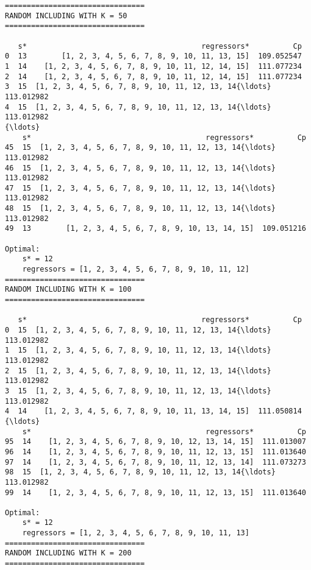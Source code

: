 \documentclass[11pt]{article}
\begin{document}
    \begin{Verbatim}[commandchars=\\\{\}]
================================
RANDOM INCLUDING WITH K = 50
================================

   s*                                        regressors*          Cp
0  13        [1, 2, 3, 4, 5, 6, 7, 8, 9, 10, 11, 13, 15]  109.052547
1  14    [1, 2, 3, 4, 5, 6, 7, 8, 9, 10, 11, 12, 14, 15]  111.077234
2  14    [1, 2, 3, 4, 5, 6, 7, 8, 9, 10, 11, 12, 14, 15]  111.077234
3  15  [1, 2, 3, 4, 5, 6, 7, 8, 9, 10, 11, 12, 13, 14{\ldots}  113.012982
4  15  [1, 2, 3, 4, 5, 6, 7, 8, 9, 10, 11, 12, 13, 14{\ldots}  113.012982
{\ldots}
    s*                                        regressors*          Cp
45  15  [1, 2, 3, 4, 5, 6, 7, 8, 9, 10, 11, 12, 13, 14{\ldots}  113.012982
46  15  [1, 2, 3, 4, 5, 6, 7, 8, 9, 10, 11, 12, 13, 14{\ldots}  113.012982
47  15  [1, 2, 3, 4, 5, 6, 7, 8, 9, 10, 11, 12, 13, 14{\ldots}  113.012982
48  15  [1, 2, 3, 4, 5, 6, 7, 8, 9, 10, 11, 12, 13, 14{\ldots}  113.012982
49  13        [1, 2, 3, 4, 5, 6, 7, 8, 9, 10, 13, 14, 15]  109.051216

Optimal:
	s* = 12
	regressors = [1, 2, 3, 4, 5, 6, 7, 8, 9, 10, 11, 12]
================================
RANDOM INCLUDING WITH K = 100
================================

   s*                                        regressors*          Cp
0  15  [1, 2, 3, 4, 5, 6, 7, 8, 9, 10, 11, 12, 13, 14{\ldots}  113.012982
1  15  [1, 2, 3, 4, 5, 6, 7, 8, 9, 10, 11, 12, 13, 14{\ldots}  113.012982
2  15  [1, 2, 3, 4, 5, 6, 7, 8, 9, 10, 11, 12, 13, 14{\ldots}  113.012982
3  15  [1, 2, 3, 4, 5, 6, 7, 8, 9, 10, 11, 12, 13, 14{\ldots}  113.012982
4  14    [1, 2, 3, 4, 5, 6, 7, 8, 9, 10, 11, 13, 14, 15]  111.050814
{\ldots}
    s*                                        regressors*          Cp
95  14    [1, 2, 3, 4, 5, 6, 7, 8, 9, 10, 12, 13, 14, 15]  111.013007
96  14    [1, 2, 3, 4, 5, 6, 7, 8, 9, 10, 11, 12, 13, 15]  111.013640
97  14    [1, 2, 3, 4, 5, 6, 7, 8, 9, 10, 11, 12, 13, 14]  111.073273
98  15  [1, 2, 3, 4, 5, 6, 7, 8, 9, 10, 11, 12, 13, 14{\ldots}  113.012982
99  14    [1, 2, 3, 4, 5, 6, 7, 8, 9, 10, 11, 12, 13, 15]  111.013640

Optimal:
	s* = 12
	regressors = [1, 2, 3, 4, 5, 6, 7, 8, 9, 10, 11, 13]
================================
RANDOM INCLUDING WITH K = 200
================================


\end{Verbatim}
\end{document}
